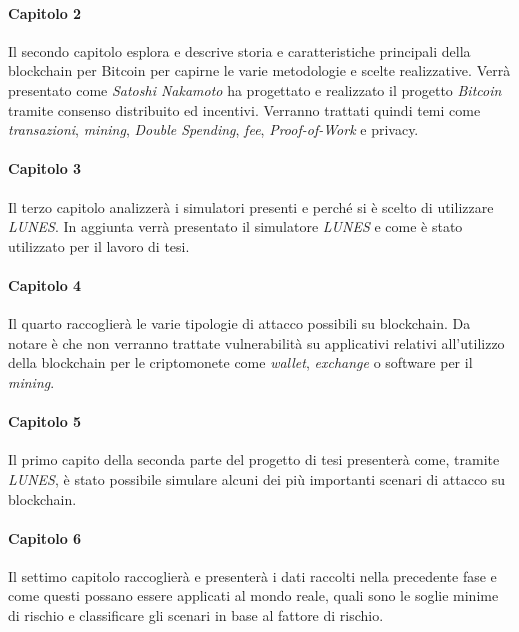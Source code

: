 \paragraph{Capitolo 2}
Il secondo capitolo esplora e descrive storia e caratteristiche principali della blockchain per Bitcoin per capirne le varie metodologie e scelte realizzative. Verrà presentato come \textit{Satoshi Nakamoto} ha progettato e realizzato il progetto \textit{Bitcoin} tramite consenso distribuito ed incentivi. Verranno trattati quindi temi come \textit{transazioni}, \textit{mining}, \textit{Double Spending}, \textit{fee}, \textit{Proof-of-Work} e privacy.

\paragraph{Capitolo 3}
Il terzo capitolo analizzerà i simulatori presenti e perché si è scelto di utilizzare \textit{LUNES}.
In aggiunta verrà presentato il simulatore \textit{LUNES} e come è stato utilizzato per il lavoro di tesi.

\paragraph{Capitolo 4}
Il quarto raccoglierà le varie tipologie di attacco possibili su blockchain. Da notare è che non verranno trattate vulnerabilità su applicativi relativi all'utilizzo della blockchain per le criptomonete come \textit{wallet}, \textit{exchange} o software per il \textit{mining}.

\paragraph{Capitolo 5}
Il primo capito della seconda parte del progetto di tesi presenterà come, tramite \textit{LUNES}, è stato possibile simulare alcuni dei più importanti scenari di attacco su blockchain.

\paragraph{Capitolo 6}
Il settimo capitolo raccoglierà e presenterà i dati raccolti nella precedente fase e come questi possano essere applicati al mondo reale, quali sono le soglie minime di rischio e classificare gli scenari in base al fattore di rischio.

